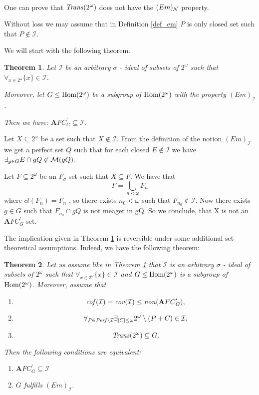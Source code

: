 \documentclass[b5cutpaper, twoside, 11pt, leqno]{moravica}
\newcommand{\nlto}{n < \omega}
\newcommand{\afcp}{{\mathbf AFC}^\prime}
\newcommand\afcg{\afcp_{G}}
\newcommand\trans{{\it Trans}(\ca)}
\newcommand{\seq}{\subseteq}
\newcommand{\ca}{2^{\omega}}
\newcommand{\mgr}{{\cal M}}
\newcommand{\neglig}{{\cal N}}
\newcommand{\oo}{\omega}
\newcommand{\perf}{{\it Perf}}
\newcommand{\cof}{{\it cof}}
\newcommand{\cov}{{\it cov}}
\newcommand{\non}{{\it non}}
\newcommand{\calI}{{\mathcal{I}}}
\newcommand\Hom{{\rm Hom(\ca)}}
\newtheorem{theorem}{Theorem}[section]
\theoremstyle{definition}
\begin{document}
 \\

One can prove that $\trans$ does not have the $(Em)_{\neglig}$ property.

Without loss we may assume that in Definition \ref{def_em}
$P$ is only closed set such that $P \not\in \calI$.

We will start with the following theorem.

\begin{theorem}
\label{em=>afcg->i}
  Let $\calI$ be an arbitrary $\sigma$ - ideal of subsets of $\ca$
such that $\forall_{x\in\ca} \lbrace x \rbrace \in \calI$.

  Moreover, let $G \leq \Hom$
be a subgroup of $\Hom$ with the property $(Em)_{\calI}$.

  Then we have:
$\afcg \seq \calI$.
\end{theorem}

\proof

Let $X \seq \ca$ be a set such that $X \not\in \calI$.
From the definition of
the notion $(Em)_{\calI}$ we get a perfect set $Q$ such that
for each closed $E \not\in \calI$ we have
$\exists_{g \in G} E \cap gQ \not\in \mgr(gQ)$.

Let $F \seq \ca$ be an $F_{\sigma}$ set
such that $X \seq F$.
We have that
$$F = \bigcup_{ \nlto } F_n$$
where $cl(F_n) = F_n$ , so there exists $n_0 < \omega$
such that $F_{n_0} \not\in \calI$.
Now there exists $g \in G$
such that $F_{n_0} \cap gQ$
is not meager in gQ.
So we conclude, that X is not an $\afcg$ set.

\bigskip

The implication given in Theorem \ref{em=>afcg->i} is reversible
under some additional set theoretical assumptions.
Indeed, we have the following theorem:

\begin{theorem}
\label{em<=>afcg->i}
  Let us assume like in Theorem \ref{em=>afcg->i}
that $\calI$ is an arbitrary $\sigma$ - ideal of subsets of $\ca$
such that $\forall_{x\in\ca} \lbrace x \rbrace \in \calI$ and
$G \leq \Hom$ is a subgroup of $\Hom$.
  Moreover, assume that
\begin{enumerate}
  \item
    \[ \cof(\calI) = \cov(\calI) \leq \non(\afcg), \]
  \item
    \[ \forall_{P\in\perf\setminus\calI} \exists_{|C| \leq \oo}
      \ca \setminus (P + C) \in \calI, \]
  \item
    \[ \trans \seq G. \]
\end{enumerate}

Then the following conditions are equivalent:

\begin{enumerate}
  \item
    $\afcg \seq \calI$
  \item
    $G$ fulfills $(Em)_{\calI}$.
\end{enumerate}
\end{theorem}
\end{document}
